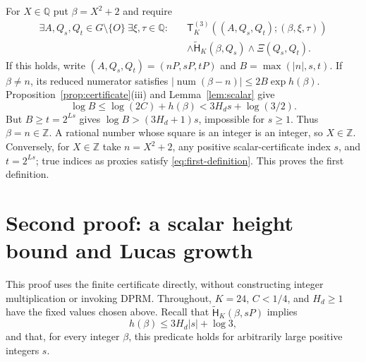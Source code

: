 \documentclass[11pt]{article}
\theoremstyle{definition}\newtheorem{inputthm}[theorem]{Hypothesis}
\theoremstyle{remark}\newtheorem{remark}[theorem]{Remark}
\newcommand{\Q}{\mathbb Q}\newcommand{\Z}{\mathbb Z}
\newcommand{\Htilde}{\widetilde{\mathsf H}}
\begin{document}
For $X\in\Q$ put $\beta=X^2+2$ and require
\begin{equation}\label{eq:first-definition}
 \begin{split}
 \exists A,Q_s,Q_t\in G\setminus\{O\}\ \exists\xi,\tau\in\Q:
 \quad&\mathsf T_K^{(3)}((A,Q_s,Q_t);(\beta,\xi,\tau))\\
 &\land\Htilde_K(\beta,Q_s)\land\Xi(Q_s,Q_t).
 \end{split}
\end{equation}
If this holds, write $(A,Q_s,Q_t)=(nP,sP,tP)$ and
$B=\max(|n|,s,t)$. If $\beta\ne n$, its reduced numerator satisfies
$|\operatorname{num}(\beta-n)|\le2B\exp h(\beta)$.
Proposition~\ref{prop:certificate}(iii) and Lemma~\ref{lem:scalar} give
\[
 \log B\le\log(2C)+h(\beta)
       <3H_ds+\log(3/2).
\]
But $B\ge t=2^{Ls}$ gives $\log B>(3H_d+1)s$, impossible for
$s\ge1$. Thus $\beta=n\in\Z$. A rational number whose square is
an integer is an integer, so $X\in\Z$.
Conversely, for $X\in\Z$ take $n=X^2+2$, any positive scalar-certificate
index $s$, and $t=2^{Ls}$; true indices as proxies satisfy
\eqref{eq:first-definition}. This proves the first definition.
\section{Second proof: a scalar height bound and Lucas growth}
\label{sec:v3-direct}

This proof uses the finite certificate directly, without constructing
integer multiplication or invoking DPRM. Throughout, $K=24$, $C<1/4$,
and $H_d\ge1$ have the fixed values chosen above. Recall that
$\widetilde{\mathsf H}_K(\beta,sP)$ implies
\[
                      h(\beta)\le3H_d|s|+\log3,
\]
and that, for every integer $\beta$, this predicate holds for
arbitrarily large positive integers $s$.
\end{document}
